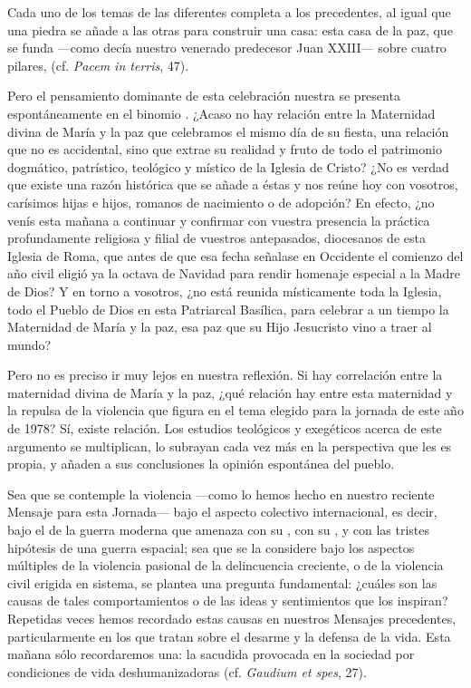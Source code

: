 \begin{body}
\begin{body}
Cada uno de los temas de las diferentes  completa a los precedentes, al igual que una piedra se añade a las otras para construir una casa: esta casa de la paz, que se funda ---como decía nuestro venerado predecesor Juan XXIII--- sobre cuatro pilares,  (cf. \emph{Pacem in terris}, 47).

Pero el pensamiento dominante de esta celebración nuestra se presenta espontáneamente en el binomio . ¿Acaso no hay relación entre la Maternidad divina de María y la paz que celebramos el mismo día de su fiesta, una relación que no es accidental, sino que extrae su realidad y fruto de todo el patrimonio dogmático, patrístico, teológico y místico de la Iglesia de Cristo? ¿No es verdad que existe una razón histórica que se añade a éstas y nos reúne hoy con vosotros, carísimos hijas e hijos, romanos de nacimiento o de adopción? En efecto, ¿no venís esta mañana a continuar y confirmar con vuestra presencia la práctica profundamente religiosa y filial de vuestros antepasados, diocesanos de esta Iglesia de Roma, que antes de que esa fecha señalase en Occidente el comienzo del año civil eligió ya la octava de Navidad para rendir homenaje especial a la Madre de Dios? Y en torno a vosotros, ¿no está reunida místicamente toda la Iglesia, todo el Pueblo de Dios en esta Patriarcal Basílica, para celebrar a un tiempo la Maternidad de María y la paz, esa paz que su Hijo Jesucristo vino a traer al mundo?

Pero no es preciso ir muy lejos en nuestra reflexión. Si hay correlación entre la maternidad divina de María y la paz, ¿qué relación hay entre esta maternidad y la repulsa de la violencia que figura en el tema elegido para la jornada de este año de 1978? Sí, existe relación. Los estudios teológicos y exegéticos acerca de este argumento se multiplican, lo subrayan cada vez más en la perspectiva que les es propia, y añaden a sus conclusiones la opinión espontánea del pueblo.

Sea que se contemple la violencia ---como lo hemos hecho en nuestro reciente Mensaje para esta Jornada--- bajo el aspecto colectivo internacional, es decir, bajo el de la guerra moderna que amenaza con su , con su , y con las tristes hipótesis de una guerra espacial; sea que se la considere bajo los aspectos múltiples de la violencia pasional de la delincuencia creciente, o de la violencia civil erigida en sistema, se plantea una pregunta fundamental: ¿cuáles son las causas de tales comportamientos o de las ideas y sentimientos que los inspiran? Repetidas veces hemos recordado estas causas en nuestros Mensajes precedentes, particularmente en los que tratan sobre el desarme y la defensa de la vida. Esta mañana sólo recordaremos una: la sacudida provocada en la sociedad por condiciones de vida deshumanizadoras (cf. \emph{Gaudium et spes}, 27).


\end{body}
\end{body}
